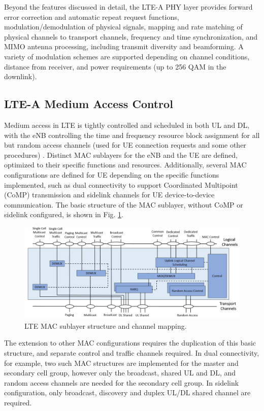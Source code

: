 Beyond the features discussed in detail, the LTE-A PHY layer provides forward error correction and automatic repeat request functions, modulation/demodulation of physical signals, mapping and rate matching of physical channels to transport channels, frequency and time synchronization, and MIMO antenna processing, including transmit diversity and beamforming.  A variety of modulation schemes are supported depending on channel conditions, distance from receiver, and power requirements (up to 256 QAM in the downlink).  

\subsection{LTE-A Medium Access Control}
\label{lte-mac}
Medium access in LTE is tightly controlled and scheduled in both UL and DL, with the eNB controlling the time and frequency resource block assignment for all but random access channels (used for UE connection requests and some other procedures) \cite{tr36321}.  Distinct MAC sublayers for the eNB and the UE are defined, optimized to their specific functions and resources.  Additionally, several MAC configurations are defined for UE depending on the specific functions implemented, such as dual connectivity to support Coordinated Multipoint (CoMP) transmission and sidelink channels for UE device-to-device communication. The basic structure of the MAC sublayer, without CoMP or sidelink configured, is shown in Fig. \ref{figs:lte-mac}.
\begin{figure}[!ht]
	\centering
	\includegraphics[width=\textwidth]{figures3/LTE-MAC}	
	\caption{LTE MAC sublayer structure and channel mapping.}
	\label{figs:lte-mac}
\end{figure}
The extension to other MAC configurations requires the duplication of this basic structure, and separate control and traffic channels required. In dual connectivity, for example, two such MAC structures are implemented for the master and secondary cell group, however only the broadcast, shared UL and DL, and random access channels are needed for the secondary cell group.  In sidelink configuration, only broadcast, discovery and duplex UL/DL shared channel are required.

